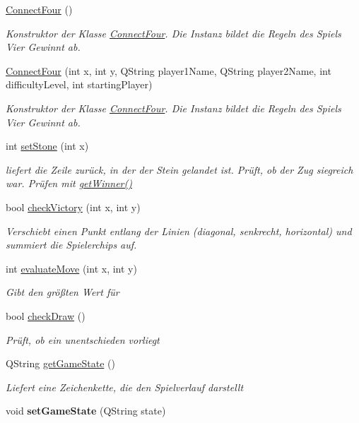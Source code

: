 \begin{DoxyCompactItemize}
\item 
\hyperlink{class_connect_four_a9d7a0db424f22513386fa60ed2d5b575}{Connect\-Four} ()
\begin{DoxyCompactList}\small\item\em Konstruktor der Klasse \hyperlink{class_connect_four}{Connect\-Four}. Die Instanz bildet die Regeln des Spiels Vier Gewinnt ab. \end{DoxyCompactList}\item 
\hyperlink{class_connect_four_ac4fca1dec417914e68e1c8fb22dc87a7}{Connect\-Four} (int x, int y, Q\-String player1\-Name, Q\-String player2\-Name, int difficulty\-Level, int starting\-Player)
\begin{DoxyCompactList}\small\item\em Konstruktor der Klasse \hyperlink{class_connect_four}{Connect\-Four}. Die Instanz bildet die Regeln des Spiels Vier Gewinnt ab. \end{DoxyCompactList}\item 
int \hyperlink{class_connect_four_aab7f413c1f52a8bc9ff21d397f9f1f3f}{set\-Stone} (int x)
\begin{DoxyCompactList}\small\item\em liefert die Zeile zurück, in der der Stein gelandet ist. Prüft, ob der Zug siegreich war. Prüfen mit \hyperlink{class_connect_four_a5b3cc0a97ca9722eb49266e651cdcf3b}{get\-Winner()} \end{DoxyCompactList}\item 
bool \hyperlink{class_connect_four_a38f2e53360ddd8b3152e6583705a1b8a}{check\-Victory} (int x, int y)
\begin{DoxyCompactList}\small\item\em Verschiebt einen Punkt entlang der Linien (diagonal, senkrecht, horizontal) und summiert die Spielerchips auf. \end{DoxyCompactList}\item 
int \hyperlink{class_connect_four_a0916903c07bfbd9891f1203373317e76}{evaluate\-Move} (int x, int y)
\begin{DoxyCompactList}\small\item\em Gibt den größten Wert für \end{DoxyCompactList}\item 
bool \hyperlink{class_connect_four_a70a3cd6ddcc7ae5b1eee3afa64ed6790}{check\-Draw} ()
\begin{DoxyCompactList}\small\item\em Prüft, ob ein unentschieden vorliegt \end{DoxyCompactList}\item 
Q\-String \hyperlink{class_connect_four_afb0b3ab58efa2888c6ee6d5c60df15b7}{get\-Game\-State} ()
\begin{DoxyCompactList}\small\item\em Liefert eine Zeichenkette, die den Spielverlauf darstellt \end{DoxyCompactList}\item 
\hypertarget{class_connect_four_a305120e52fd04399c7e4aa66ede018a2}{void {\bfseries set\-Game\-State} (Q\-String state)}\label{class_connect_four_a305120e52fd04399c7e4aa66ede018a2}


\end{DoxyCompactItemize}
